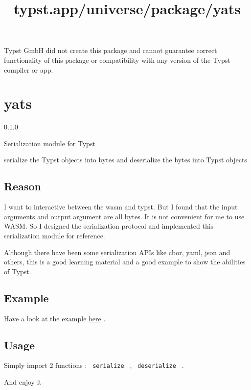 Typst GmbH did not create this package and cannot guarantee correct
functionality of this package or compatibility with any version of the
Typst compiler or app.


\title{typst.app/universe/package/yats}

\label{banner}
\section{yats}\label{yats}

{ 0.1.0 }

Serialization module for Typst

\label{readme}
serialize the Typst objects into bytes and deserialize the bytes into
Typst objects

\subsection{Reason}\label{reason}

I want to interactive between the wasm and typst. But I found that the
input arguments and output argument are all bytes. It is not convenient
for me to use WASM. So I designed the serialization protocol and
implemented this serialization module for reference.

Although there have been some serialization APIs like cbor, yaml, json
and others, this is a good learning material and a good example to show
the abilities of Typst.

\subsection{Example}\label{example}

Have a look at the example
\href{https://github.com/typst/packages/raw/main/packages/preview/yats/0.1.0/example.typ}{here}
.

\subsection{Usage}\label{usage}

Simply import 2 functions : \texttt{\ serialize\ } ,
\texttt{\ deserialize\ } .

And enjoy it

\begin{Shaded}
\begin{Highlighting}[]
\NormalTok{\#\{}
\NormalTok{  )}
\NormalTok{\}}
\end{Highlighting}
\end{Shaded}

